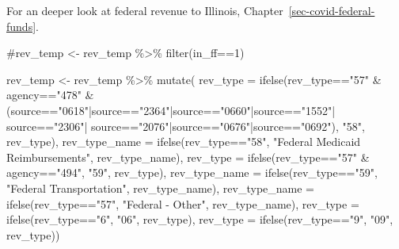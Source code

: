 \documentclass[
  letterpaper,
  DIV=11,
  numbers=noendperiod]{scrreport}
\newenvironment{Shaded}{\begin{snugshade}}{\end{snugshade}}
\newcommand{\AttributeTok}[1]{\textcolor[rgb]{0.40,0.45,0.13}{#1}}
\newcommand{\CommentTok}[1]{\textcolor[rgb]{0.37,0.37,0.37}{#1}}
\newcommand{\FunctionTok}[1]{\textcolor[rgb]{0.28,0.35,0.67}{#1}}
\newcommand{\NormalTok}[1]{\textcolor[rgb]{0.00,0.23,0.31}{#1}}
\newcommand{\OtherTok}[1]{\textcolor[rgb]{0.00,0.23,0.31}{#1}}
\newcommand{\SpecialCharTok}[1]{\textcolor[rgb]{0.37,0.37,0.37}{#1}}
\newcommand{\StringTok}[1]{\textcolor[rgb]{0.13,0.47,0.30}{#1}}
\begin{document}
For an deeper look at federal revenue to Illinois,
Chapter~\ref{sec-covid-federal-funds}.

\begin{Shaded}
\begin{Highlighting}[]
\CommentTok{\#rev\_temp \textless{}{-} rev\_temp \%\textgreater{}\% filter(in\_ff==1)}

\NormalTok{rev\_temp }\OtherTok{\textless{}{-}}\NormalTok{ rev\_temp }\SpecialCharTok{\%\textgreater{}\%} 
  \FunctionTok{mutate}\NormalTok{(}
    \AttributeTok{rev\_type =} \FunctionTok{ifelse}\NormalTok{(rev\_type}\SpecialCharTok{==}\StringTok{"57"} \SpecialCharTok{\&}\NormalTok{ agency}\SpecialCharTok{==}\StringTok{"478"} \SpecialCharTok{\&}\NormalTok{ (source}\SpecialCharTok{==}\StringTok{"0618"}\SpecialCharTok{|}\NormalTok{source}\SpecialCharTok{==}\StringTok{"2364"}\SpecialCharTok{|}\NormalTok{source}\SpecialCharTok{==}\StringTok{"0660"}\SpecialCharTok{|}\NormalTok{source}\SpecialCharTok{==}\StringTok{"1552"}\SpecialCharTok{|}\NormalTok{ source}\SpecialCharTok{==}\StringTok{"2306"}\SpecialCharTok{|}\NormalTok{ source}\SpecialCharTok{==}\StringTok{"2076"}\SpecialCharTok{|}\NormalTok{source}\SpecialCharTok{==}\StringTok{"0676"}\SpecialCharTok{|}\NormalTok{source}\SpecialCharTok{==}\StringTok{"0692"}\NormalTok{), }\StringTok{"58"}\NormalTok{, rev\_type),}
    \AttributeTok{rev\_type\_name =} \FunctionTok{ifelse}\NormalTok{(rev\_type}\SpecialCharTok{==}\StringTok{"58"}\NormalTok{, }\StringTok{"Federal Medicaid Reimbursements"}\NormalTok{, rev\_type\_name),}
    \AttributeTok{rev\_type =} \FunctionTok{ifelse}\NormalTok{(rev\_type}\SpecialCharTok{==}\StringTok{"57"} \SpecialCharTok{\&}\NormalTok{ agency}\SpecialCharTok{==}\StringTok{"494"}\NormalTok{, }\StringTok{"59"}\NormalTok{, rev\_type),}
    \AttributeTok{rev\_type\_name =} \FunctionTok{ifelse}\NormalTok{(rev\_type}\SpecialCharTok{==}\StringTok{"59"}\NormalTok{, }\StringTok{"Federal Transportation"}\NormalTok{, rev\_type\_name),}
    \AttributeTok{rev\_type\_name =} \FunctionTok{ifelse}\NormalTok{(rev\_type}\SpecialCharTok{==}\StringTok{"57"}\NormalTok{, }\StringTok{"Federal {-} Other"}\NormalTok{, rev\_type\_name),}
    \AttributeTok{rev\_type =} \FunctionTok{ifelse}\NormalTok{(rev\_type}\SpecialCharTok{==}\StringTok{"6"}\NormalTok{, }\StringTok{"06"}\NormalTok{, rev\_type),}
    \AttributeTok{rev\_type =} \FunctionTok{ifelse}\NormalTok{(rev\_type}\SpecialCharTok{==}\StringTok{"9"}\NormalTok{, }\StringTok{"09"}\NormalTok{, rev\_type)) }


\end{Highlighting}
\end{Shaded}
\end{document}
